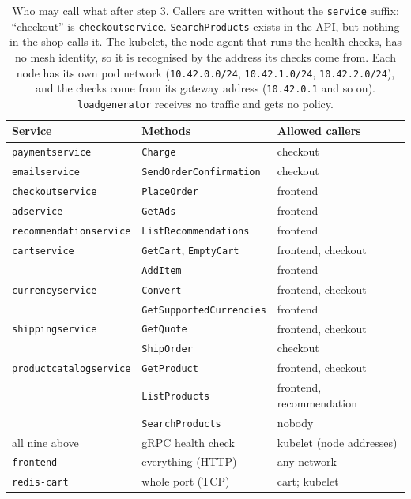 \documentclass[12pt,a4paper]{article}
\begin{document}
\begin{table}[H]
  \centering
  \small
  \begin{tabular}{lll}
    \toprule
    Service & Methods & Allowed callers \\
    \midrule
    \texttt{paymentservice}        & \texttt{Charge}                       & checkout \\
    \texttt{emailservice}          & \texttt{SendOrderConfirmation}        & checkout \\
    \texttt{checkoutservice}       & \texttt{PlaceOrder}                   & frontend \\
    \texttt{adservice}             & \texttt{GetAds}                       & frontend \\
    \texttt{recommendationservice} & \texttt{ListRecommendations}          & frontend \\
    \texttt{cartservice}           & \texttt{GetCart}, \texttt{EmptyCart}  & frontend, checkout \\
                                   & \texttt{AddItem}                      & frontend \\
    \texttt{currencyservice}       & \texttt{Convert}                      & frontend, checkout \\
                                   & \texttt{GetSupportedCurrencies}       & frontend \\
    \texttt{shippingservice}       & \texttt{GetQuote}                     & frontend, checkout \\
                                   & \texttt{ShipOrder}                    & checkout \\
    \texttt{productcatalogservice} & \texttt{GetProduct}                   & frontend, checkout \\
                                   & \texttt{ListProducts}                 & frontend, recommendation \\
                                   & \texttt{SearchProducts}               & nobody \\
    all nine above                 & gRPC health check                     & kubelet (node addresses) \\
    \texttt{frontend}              & everything (HTTP)                     & any network \\
    \texttt{redis-cart}            & whole port (TCP)                      & cart; kubelet \\
    \bottomrule
  \end{tabular}
  \caption{Who may call what after step 3. Callers are written without the
    \texttt{service} suffix: ``checkout'' is \texttt{checkoutservice}.
    \texttt{SearchProducts} exists in the API, but nothing in the shop calls
    it. The kubelet, the node agent that runs the health checks, has no mesh
    identity, so it is recognised by the address its checks come from. Each
    node has its own pod network (\texttt{10.42.0.0/24},
    \texttt{10.42.1.0/24}, \texttt{10.42.2.0/24}), and the checks come from
    its gateway address (\texttt{10.42.0.1} and so on).
    \texttt{loadgenerator} receives no traffic and gets no policy.}
  \label{tab:matrix}
\end{table}
\end{document}
